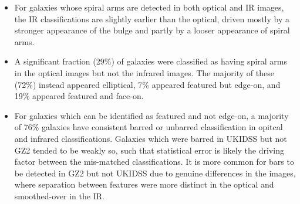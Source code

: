\begin{itemize}

\item For galaxies whose spiral arms are detected in both optical and IR images, the IR classifications are slightly earlier than the optical, driven mostly by a stronger appearance of the bulge and partly by a looser appearance of spiral arms. 

\item A significant fraction (29\%) of galaxies were classified as having spiral arms in the optical images but not the infrared images. The majority of these (72\%) instead appeared elliptical, 7\% appeared featured but edge-on, and 19\% appeared featured and face-on.

\item For galaxies which can be identified as featured and not edge-on, a majority of 76\% galaxies have consistent barred or unbarred classification in opitcal and infrared classifications. Galaxies which were barred in UKIDSS but not GZ2 tended to be weakly so, such that statistical error is likely the driving factor between the mis-matched classifications. It is more common for bars to be detected in GZ2 but not UKIDSS due to genuine differences in the images, where separation between features were more distinct in the optical and smoothed-over in the IR. 


\end{itemize}
